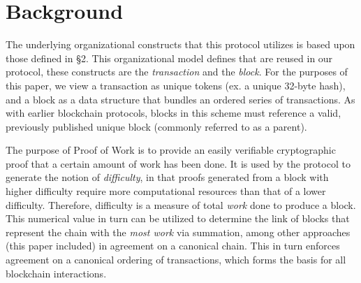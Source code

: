 \section{Background}
\label{background}


The underlying organizational constructs that this protocol utilizes is based upon
those defined in \cite{wood2014ethereum} \S2. This organizational model defines
that are reused in our protocol, these constructs are the \textit{transaction} and
the \textit{block}. For the purposes of this paper, we view a transaction as
unique tokens (ex. a unique 32-byte hash), and a block as a data structure that
bundles an ordered series of transactions. As with earlier blockchain protocols,
blocks in this scheme must reference a valid, previously published unique block
(commonly referred to as a parent).

The purpose of Proof of Work is to provide an easily verifiable cryptographic proof
that a certain amount of work has been done. It is used by the protocol to generate
the notion of \textit{difficulty}, in that proofs generated from a block with higher
difficulty require more computational resources than that of a lower difficulty.
Therefore, difficulty is a measure of total \textit{work} done to produce a block.
This numerical value in turn can be utilized to determine the link of blocks that
represent the chain with the \textit{most work} via summation, among other approaches
(this paper included) in agreement on a canonical chain. This in turn enforces agreement
on a canonical ordering of transactions, which forms the basis for all blockchain interactions.



